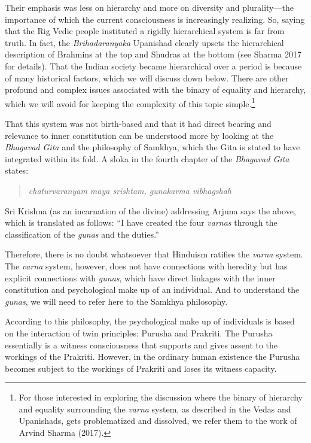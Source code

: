 Their emphasis was less on hierarchy and more on diversity and plurality—the importance of which the current consciousness is increasingly realizing. So, saying that the Rig Vedic people instituted a rigidly hierarchical system is far from truth. In fact, the \textit{Brihadaranyaka} Upanishad clearly upsets the hierarchical description of Brahmins at the top and Shudras at the bottom (see Sharma 2017 for details). That the Indian society became hierarchical over a period is because of many historical factors, which we will discuss down below. There are other profound and complex issues associated with the binary of equality and hierarchy, which we will avoid for keeping the complexity of this topic simple.\footnote{For those interested in exploring the discussion where the binary of hierarchy and equality surrounding the \textit{varna}  	system, as described in the Vedas and Upanishads, gets problematized and dissolved, we refer them to the work of Arvind Sharma (2017).}

That this system was not birth-based and that it had direct bearing and relevance to inner constitution can be understood more by looking at the \textit{Bhagavad Gita} and the philosophy of Samkhya, which the Gita is stated to have integrated within its fold. A sloka in the fourth chapter of the \textit{Bhagavad Gita} states:

\begin{quote}
\textit{chaturvaranyam maya srishtam, gunakarma vibhagshah} 
\end{quote}
Sri Krishna (as an incarnation of the divine) addressing Arjuna says the above, which is translated as follows: “I have created the four \textit{varnas} through the classification of the \textit{gunas} and the duties.”

Therefore, there is no doubt whatsoever that Hinduism ratifies the \textit{varna} system. The \textit{varna} system, however, does not have connections with heredity but has explicit connections with \textit{gunas},  which have direct linkages with the inner constitution and psychological make up of an individual. And to understand the \textit{gunas},  we will need to refer here to the Samkhya philosophy. 

According to this philosophy, the psychological make up of individuals is based on the interaction of twin principles: Purusha  and Prakriti. The Purusha  essentially is a witness consciousness that supports and gives assent to the workings of the Prakriti. However, in the ordinary human existence the Purusha  becomes subject to the workings of Prakriti  and loses its witness capacity. 

